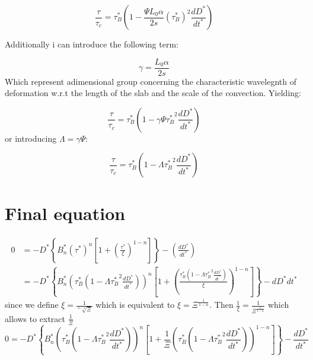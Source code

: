 \documentclass{article}
\begin{document}
\begin{equation}
    \frac{\tau}{\tau_c} = \tau^{*}_{B} \left( 1-\frac{\Psi L_0 \alpha}{2s}\left({\tau^{*}_B}\right)^2 \frac{dD^{*}}{dt^{*}}\right)
    \label{eq:no_d_tau_eff}
\end{equation}

Additionally i can introduce the following term: 

\begin{equation}
    \gamma = \frac{L_0 \alpha}{2 s}
\end{equation}
Which represent adimensional group concerning the characteristic wavelegnth of deformation w.r.t the length of the slab and the scale of the convection. 
Yielding: 

\begin{equation}
    \frac{\tau}{\tau_c} = \tau^{*}_{B} \left( 1-\gamma \Psi {\tau^{*}_B}^2 \frac{dD^{*}}{dt^{*}}\right)
    \label{eq:no_d_tau_eff}
\end{equation}
or introducing $\Lambda= \gamma \Psi$: 

\begin{equation}
    \frac{\tau}{\tau_c} = \tau^{*}_{B} \left( 1-\Lambda {\tau^{*}_B}^2 \frac{dD^{*}}{dt^{*}}\right)
    \label{eq:no_d_tau_eff}
\end{equation}

\section{Final equation}

\begin{align}
    0 &= -D^{*} \left\{B_n^{*}  \left(\tau^{*}\right)^n \left[ 1+ \left( \frac{\tau^{*}}{\xi} \right)^{1-n} \right] \right\} -\left(\frac{dD^{*}}{dt^{*}}\right)\\
    &=-D^{*} \left\{B_n^{*}  \left(\tau^{*}_{B} \left( 1-\Lambda {\tau^{*}_B}^2 \frac{dD^{*}}{dt^{*}}\right)\right)^n \left[ 1+ \left( \frac{\tau^{*}_{B} \left( 1-\Lambda {\tau^{*}_B}^2 \frac{dD^{*}}{dt^{*}}\right)}{\xi} \right)^{1-n} \right] \right\} -{dD^{*}}{dt^{*}}
  \label{eq:Main_equation}
\end{align}
since we define $\xi = \frac{1}{\sqrt[n-1]{\Xi}}$ which is equivalent to $\xi=\Xi^{\frac{1}{1-n}}$. Then $\frac{1}{\xi}=\frac{1}{\Xi^{\frac{1}{1-n}}}$ which allows to extract $\frac{1}{\Xi}$
\begin{equation}
    0 =-D^{*}\left\{B_n^{*}\left(\tau^{*}_{B} \left( 1- \Lambda {\tau^{*}_B}^2 \frac{dD^{*}}{dt^{*}}\right)\right)^n \left[ 1+ \frac{1}{\Xi}\left( \tau^{*}_{B} \left( 1-\Lambda{\tau^{*}_B}^2 \frac{dD^{*}}{dt^{*}}\right)\right)^{1-n} \right] \right\} -\frac{dD^{*}}{dt^{*}}
  \label{eq:Main_equation}
\end{equation}
\end{document}
